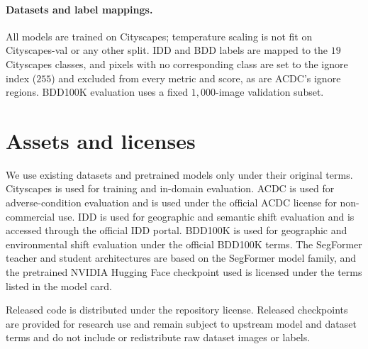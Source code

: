 \documentclass{article}
\begin{document}
\paragraph{Datasets and label mappings.} All models are trained on Cityscapes; temperature scaling is not fit on Cityscapes-val or any other split. IDD and BDD labels are mapped to the $19$ Cityscapes classes, and pixels with no corresponding class are set to the ignore index ($255$) and excluded from every metric and score, as are ACDC's ignore regions. BDD100K evaluation uses a fixed $1{,}000$-image validation subset.


\section{Assets and licenses}
\label{app:assets-licenses}
We use existing datasets and pretrained models only under their original terms. Cityscapes is used for training and in-domain evaluation. ACDC is used for adverse-condition evaluation and is used under the official ACDC license for non-commercial use. IDD is used for geographic and semantic shift evaluation and is accessed through the official IDD portal. BDD100K is used for geographic and environmental shift evaluation under the official BDD100K terms. The SegFormer teacher and student architectures are based on the SegFormer model family, and the pretrained NVIDIA Hugging Face checkpoint used is licensed under the terms listed in the model card.

Released code is distributed under the repository license. Released checkpoints are provided for research use and remain subject to upstream model and dataset terms and do not include or redistribute raw dataset images or labels.
\end{document}
